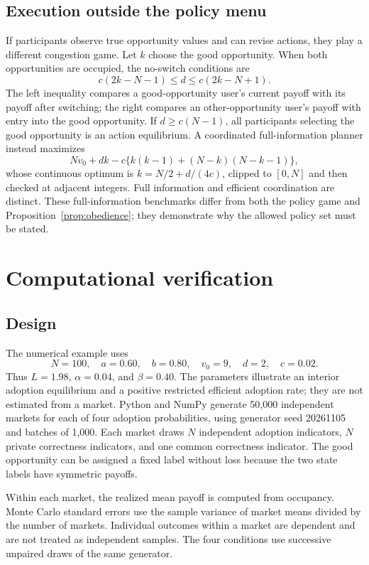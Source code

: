 \documentclass[11pt,a4paper]{article}
\theoremstyle{definition}
\theoremstyle{remark}
\begin{document}
\subsection{Execution outside the policy menu}
If participants observe true opportunity values and can revise actions, they play a different congestion game. Let $k$ choose the good opportunity. When both opportunities are occupied, the no-switch conditions are
\begin{equation}\label{eq:action}
 c(2k-N-1)\leq d\leq c(2k-N+1).
\end{equation}
The left inequality compares a good-opportunity user's current payoff with its payoff after switching; the right compares an other-opportunity user's payoff with entry into the good opportunity. If $d\geq c(N-1)$, all participants selecting the good opportunity is an action equilibrium. A coordinated full-information planner instead maximizes
\begin{equation}
 Nv_0+dk-c\{k(k-1)+(N-k)(N-k-1)\},
\end{equation}
whose continuous optimum is $k=N/2+d/(4c)$, clipped to $[0,N]$ and then checked at adjacent integers. Full information and efficient coordination are distinct. These full-information benchmarks differ from both the policy game and Proposition~\ref{prop:obedience}; they demonstrate why the allowed policy set must be stated.

\section{Computational verification}
\subsection{Design}
The numerical example uses
\[
 N=100,\quad a=0.60,\quad b=0.80,\quad v_0=9,
 \quad d=2,\quad c=0.02.
\]
Thus $L=1.98$, $\alpha=0.04$, and $\beta=0.40$. The parameters illustrate an interior adoption equilibrium and a positive restricted efficient adoption rate; they are not estimated from a market. Python and NumPy generate 50,000 independent markets for each of four adoption probabilities, using generator seed 20261105 and batches of 1,000. Each market draws $N$ independent adoption indicators, $N$ private correctness indicators, and one common correctness indicator. The good opportunity can be assigned a fixed label without loss because the two state labels have symmetric payoffs.

Within each market, the realized mean payoff is computed from occupancy. Monte Carlo standard errors use the sample variance of market means divided by the number of markets. Individual outcomes within a market are dependent and are not treated as independent samples. The four conditions use successive unpaired draws of the same generator.
\end{document}

